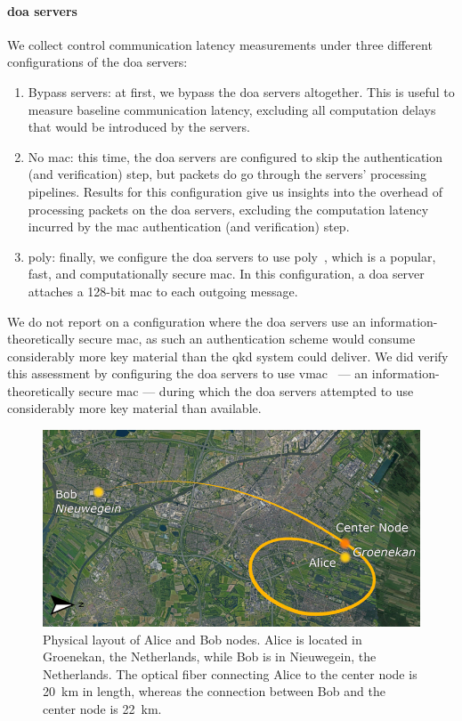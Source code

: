 \paragraph{\acrshort{doa} servers}

We collect control communication latency measurements under three different configurations of the
\acrshort{doa} servers:

\begin{enumerate}
    \item Bypass servers: at first, we bypass the \acrshort{doa} servers altogether. This is useful
          to measure baseline communication latency, excluding all computation delays that would be
          introduced by the servers.
    \item No \acrshort{mac}: this time, the \acrshort{doa} servers are configured to skip the
          authentication (and verification) step, but packets do go through the servers' processing
          pipelines. Results for this configuration give us insights into the overhead of processing
          packets on the \acrshort{doa} servers, excluding the computation latency incurred by the
          \acrshort{mac} authentication (and verification) step.
    \item \acrshort{poly}: finally, we configure the \acrshort{doa} servers to use
          \acrshort{poly}~\cite{bernstein_2005_poly1305}, which is a popular, fast, and
          computationally secure \acrshort{mac}. In this configuration, a \acrshort{doa} server
          attaches a \num{128}-bit mac to each outgoing message.
\end{enumerate}

We do not report on a configuration where the \acrshort{doa} servers use an
information-theoretically secure \acrshort{mac}, as such an authentication scheme would consume
considerably more key material than the \acrshort{qkd} system could deliver. We did verify this
assessment by configuring the \acrshort{doa} servers to use
\acrshort{vmac}~\cite{krovetz_2007_message} --- an information-theoretically secure \acrshort{mac}
--- during which the \acrshort{doa} servers attempted to use considerably more key material than
available.

\begin{figure}[t]
    \centering
    \includegraphics[width=0.6\linewidth]{figures/mac-setup-qkd-locations-resized.png}
    \caption{
        Physical layout of Alice and Bob nodes. Alice is located in Groenekan, the Netherlands,
        while Bob is in Nieuwegein, the Netherlands. The optical fiber connecting Alice to the
        center node is \qty{20}{\km} in length, whereas the connection between Bob and the center
        node is \qty{22}{\km}.
    }
    \label{fig:mac-setup-qkd-locations}
\end{figure}

